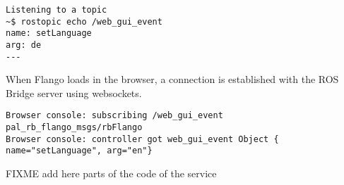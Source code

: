 \begin{lstlisting}[caption=Listening to a topic, label=impl-flango-ros-topic-echo]
Listening to a topic
~$ rostopic echo /web_gui_event
name: setLanguage
arg: de
---
\end{lstlisting}

When Flango \cm loads in the browser, a connection is established with the ROS Bridge server using websockets.
\begin{lstlisting}[caption=Listening to a topic (Browser), label=impl-flango-ros-topic-browser]
Browser console: subscribing /web_gui_event pal_rb_flango_msgs/rbFlango
Browser console: controller got web_gui_event Object { name="setLanguage", arg="en"}
\end{lstlisting}

FIXME add here parts of the code of the service
